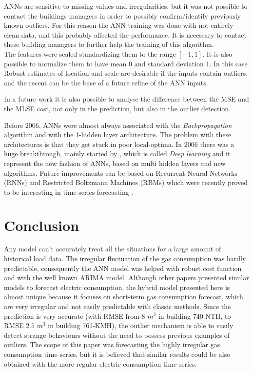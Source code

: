\documentclass{sig-alternate-sigmod07}
\begin{document}
ANNs are sensitive to missing values and irregularities, but it was not possible to contact the buildings managers in order to possibly confirm/identify previously known outliers. For this reason the ANN training was done with not entirely clean data, and this probably affected the performance. It is necessary to contact these building managers to further help the training of this algorithm. \\
The features were scaled standardizing them to the range $[-1, 1]$. It is also possible to normalize them to have mean $0$ and standard deviation $1$. In this case Robust estimates of location and scale are desirable if the inputs contain outliers. \cite{iglewicz1983robust} and the recent \cite{mizera2004location} can be the base of a future refine of the ANN inputs.

In a future work it is also possible to analyse the difference between the MSE and the MLSE cost, not only in the prediction, but also in the outlier detection.

Before $2006$, ANNs were almost always associated with the \emph{Backpropagation} algorithm and with the 1-hidden layer architecture. The problem with these architectures is that they get stuck in poor local-optima. In 2006 there was a huge breakthrough, mainly started by \cite{hinton2006fast}, which is called \emph{Deep learning} and it represent the new fashion of ANNs, based on multi hidden layers and new algorithms. Future improvements can be based on Recurrent Neural Networks (RNNs) and Restricted Boltzmann Machines (RBMs) which were recently proved to be interesting in time-series forecasting \cite{busseti2012deep, taylor2009factored, sutskever2013training}.



\section{Conclusion}
\label{sec:conclusion}

Any model can't accurately treat all the situations for a large amount of historical load data. The irregular fluctuation of the gas consumption was hardly predictable, consequently the ANN model was helped with robust cost function and with the well known ARIMA model. Although other papers presented similar models to forecast electric consumption, the hybrid model presented here is almost unique because it focuses on short-term gas consumption forecast, which are very irregular and not easily predictable with classic methods. Since the prediction is very accurate (with RMSE from $8$ $m^3$ in building 740-NTH, to RMSE $2.5$ $m^3$ in building 761-KMH), the outlier mechanism is able to easily detect strange behaviours without the need to possess previous examples of outliers. The scope of this paper was forecasting the highly irregular gas consumption time-series, but it is believed that similar results could be also obtained with the more regular electric consumption time-series. 
\end{document}
